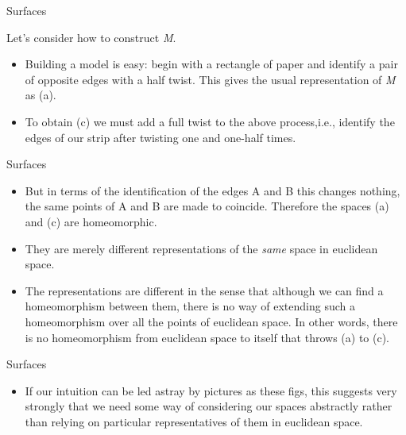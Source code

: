 \documentclass{beamer}
\begin{document}
\begin{frame}{Surfaces}
  \begin{block}{}
    Let's consider how to construct \textsl{M}.
    \begin{itemize}
    \item Building a model is easy: begin with a rectangle of paper and identify a pair of opposite edges with a half twist. This gives the usual representation of \textsl{M} as (a).
    \item To obtain (c) we must add a full twist to the above process,i.e., identify the edges of our strip after twisting one and one-half times.
    \end{itemize}
  \end{block}
\end{frame}

\begin{frame}{Surfaces}
  \begin{block}{}
    \begin{itemize}
    \item But in terms of the identification of the edges A and B this changes nothing, the same points of A and B are made to coincide. Therefore the spaces (a) and (c) are homeomorphic.
    \item They are merely different representations of the \textsl{same} space in euclidean space.
    \item The representations are different in the sense that although we can find a homeomorphism between them, there is no way of extending such a homeomorphism over all the points of euclidean space. In other words, there is no homeomorphism from euclidean space to itself that throws (a) to (c).
    \end{itemize}
  \end{block}
\end{frame}

\begin{frame}{Surfaces}
  \begin{block}{}
    \begin{itemize}
    \item If our intuition can be led astray by pictures as these figs, this suggests very strongly that we need some way of considering our spaces abstractly rather than relying on particular representatives of them in euclidean space.
    \end{itemize}
  \end{block}
\end{frame}
\end{document}
